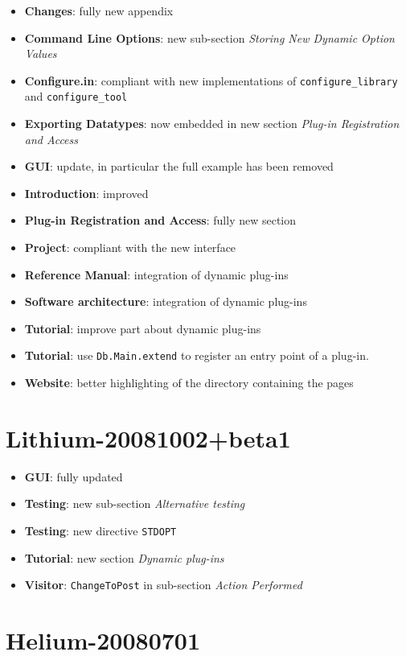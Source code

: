 \begin{itemize}
\item \textbf{Changes}: fully new appendix
\item \textbf{Command Line Options}: new sub-section \emph{Storing New Dynamic
    Option Values}
\item \textbf{Configure.in}: compliant with new implementations of
  \texttt{configure\_library} and \texttt{configure\_tool}
\item \textbf{Exporting Datatypes}: now embedded in new section \emph{Plug-in
  Registration and Access}
\item \textbf{GUI}: update, in particular the full example has been removed
\item \textbf{Introduction}: improved
\item \textbf{Plug-in Registration and Access}: fully new section
\item \textbf{Project}: compliant with the new interface
\item \textbf{Reference Manual}: integration of dynamic plug-ins
\item \textbf{Software architecture}: integration of dynamic plug-ins
\item \textbf{Tutorial}: improve part about dynamic plug-ins
\item \textbf{Tutorial}: use \texttt{Db.Main.extend} to register an entry
  point of a plug-in.
\item \textbf{Website}: better highlighting of the directory containing the
  \html pages
\end{itemize}

\section*{Lithium-20081002+beta1}

\begin{itemize}
\item \textbf{GUI}: fully updated
\item \textbf{Testing}: new sub-section \emph{Alternative testing}
\item \textbf{Testing}: new directive \texttt{STDOPT}
\item \textbf{Tutorial}: new section \emph{Dynamic plug-ins}
\item \textbf{Visitor}: \texttt{ChangeToPost} in sub-section \emph{Action
  Performed}
\end{itemize}

\section*{Helium-20080701}

